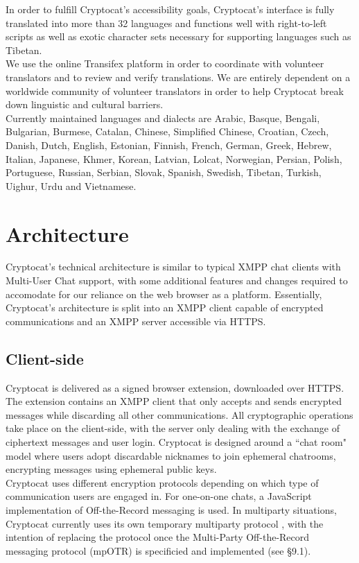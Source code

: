 \documentclass[letterpaper,twocolumn,10pt]{article}
\begin{document}
In order to fulfill Cryptocat's accessibility goals, Cryptocat's interface is fully translated into more than 32 languages and functions well with right-to-left scripts as well as exotic character sets necessary for supporting languages such as Tibetan. \\
We use the online Transifex \cite{transifex} platform in order to coordinate with volunteer translators and to review and verify translations. We are entirely dependent on a worldwide community of volunteer translators in order to help Cryptocat break down linguistic and cultural barriers. \\
Currently maintained languages and dialects are Arabic, Basque, Bengali, Bulgarian, Burmese, Catalan, Chinese, Simplified Chinese, Croatian, Czech, Danish, Dutch, English, Estonian, Finnish, French, German, Greek, Hebrew, Italian, Japanese, Khmer, Korean, Latvian, Lolcat, Norwegian, Persian, Polish, Portuguese, Russian, Serbian, Slovak, Spanish, Swedish, Tibetan, Turkish, Uighur, Urdu and Vietnamese.

\section{Architecture}

Cryptocat's technical architecture is similar to typical XMPP chat clients with Multi-User Chat support, with some additional features and changes required to accomodate for our reliance on the web browser as a platform. Essentially, Cryptocat's architecture is split into an XMPP client capable of encrypted communications and an XMPP server accessible via HTTPS.

\subsection{Client-side}

Cryptocat is delivered as a signed browser extension, downloaded over HTTPS. The extension contains an XMPP client that only accepts and sends encrypted messages while discarding all other communications. All cryptographic operations take place on the client-side, with the server only dealing with the exchange of ciphertext messages and user login. Cryptocat is designed around a ``chat room" model where users adopt discardable nicknames to join ephemeral chatrooms, encrypting messages using ephemeral public keys. \\
Cryptocat uses different encryption protocols depending on which type of communication users are engaged in. For one-on-one chats, a JavaScript implementation \cite{otrjs} of Off-the-Record messaging \cite{otr} is used. In multiparty situations, Cryptocat currently uses its own temporary multiparty protocol \cite{cryptocat-spec}, with the intention of replacing the protocol once the Multi-Party Off-the-Record messaging protocol (mpOTR) \cite{mpotr} is specificied and implemented (see \S9.1).
\end{document}
